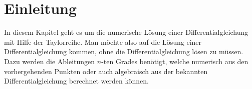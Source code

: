 %
%
%
\section{Einleitung
\label{taylor:section:einleitung}}
In diesem Kapitel geht es um die numerische Lösung einer Differentialgleichung mit Hilfe der Taylorreihe.
Man möchte also auf die Lösung einer Differentialgleichung kommen, ohne die Differentialgleichung lösen zu müssen.
Dazu werden die Ableitungen $n$-ten Grades benötigt, welche numerisch aus den vorhergehenden Punkten oder auch algebraisch aus der bekannten Differentialgleichung berechnet werden können.

